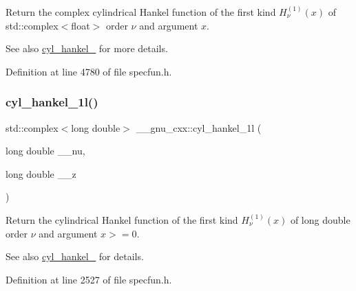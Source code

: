 Return the complex cylindrical Hankel function of the first kind $ H^{(1)}_\nu(x) $ of {\ttfamily std\+::complex$<$float$>$} order $ \nu $ and argument $ x $.

\begin{DoxySeeAlso}{See also}
\hyperlink{group__gnu__math__spec__func_ga5329bba77d10a9d2f15d9bbe43a70db3}{cyl\+\_\+hankel\+\_} for more details. 
\end{DoxySeeAlso}


Definition at line 4780 of file specfun.\+h.

\mbox{\label{group__gnu__math__spec__func_gacb49c66b4267fbc56906db02f14365f2}} 
\subsubsection{\texorpdfstring{cyl\+\_\+hankel\+\_\+1l()}{cyl\_hankel\_1l()}\hspace{0.1cm}{\footnotesize\ttfamily [1/2]}}
{\footnotesize\ttfamily std\+::complex$<$long double$>$ \+\_\+\+\_\+gnu\+\_\+cxx\+::cyl\+\_\+hankel\+\_\+1l (\begin{DoxyParamCaption}\item[{long double}]{\+\_\+\+\_\+nu,  }\item[{long double}]{\+\_\+\+\_\+z }\end{DoxyParamCaption})\hspace{0.3cm}{\ttfamily [inline]}}

Return the cylindrical Hankel function of the first kind $ H^{(1)}_\nu(x) $ of {\ttfamily long double} order $ \nu $ and argument $ x >= 0 $.

\begin{DoxySeeAlso}{See also}
\hyperlink{group__gnu__math__spec__func_ga5329bba77d10a9d2f15d9bbe43a70db3}{cyl\+\_\+hankel\+\_} for details. 
\end{DoxySeeAlso}


Definition at line 2527 of file specfun.\+h.

\mbox{\label{group__gnu__math__spec__func_ga6900f79ec70673bcb001538aec74e07c}} 
